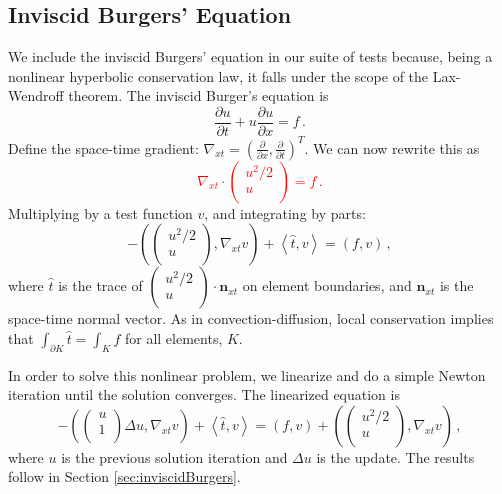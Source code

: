 \documentclass[letterpaper]{article}
\newcommand{\LRp}[1]{\left( #1 \right)}
\newcommand{\LRa}[1]{\left\langle #1 \right\rangle}
\newcommand{\Grad} {\ensuremath{\nabla}}
\def\vecttwo#1#2{\left(
\begin{array}{c}
#1\\
#2\\
\end{array}
\right)}
\newcommand{\red}[1]{\textcolor{red}{#1}}
\begin{document}
\subsection{Inviscid Burgers' Equation}
We include the inviscid Burgers' equation in our suite of tests because, being
a nonlinear hyperbolic conservation law, it
falls under the scope of the Lax-Wendroff theorem. %
The inviscid Burger's equation is
\[
\frac{\partial u}{\partial t}+u\frac{\partial u}{\partial x}=f\,.
\]
Define the space-time gradient: $\Grad_{xt}=\LRp{\frac{\partial}{\partial
x},\frac{\partial}{\partial t}}^T$. We can now rewrite this as
\red{
\[
\Grad_{xt}\cdot\vecttwo{u^2/2}{u}=f\,.
\]
}
Multiplying by a test function $v$, and integrating by parts:
\[
-\LRp{\vecttwo{u^2/2}{u},\Grad_{xt}v}+\LRa{\hat t,v}=\LRp{f,v}\,,
\]
where $\hat t$ is the trace of $\vecttwo{u^2/2}{u}\cdot\mathbf{n}_{xt}$ on
element boundaries, and $\mathbf{n}_{xt}$ is the space-time normal vector.
As in convection-diffusion, local conservation implies that
$\int_{\partial K}\hat t=\int_Kf$ for all elements, $K$.

In order to solve this nonlinear problem, we linearize and do a simple Newton iteration
until the solution converges. The linearized equation is
\[
-\LRp{\vecttwo{u}{1}\Delta u,\Grad_{xt}v}+\LRa{\hat t,v}=\LRp{f,v}
+\LRp{\vecttwo{u^2/2}{u},\Grad_{xt}v} \,,
\]
where $u$ is the previous solution iteration and $\Delta u$ is the update.
The results follow in Section \ref{sec:inviscidBurgers}.
\end{document}
